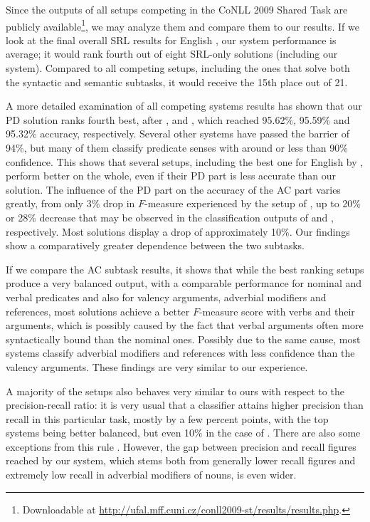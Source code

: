 \documentclass[12pt,notitlepage]{report}
\begin{document}
Since the outputs of all setups competing in the CoNLL 2009 Shared Task are publicly available\footnote{Downloadable at \url{http://ufal.mff.cuni.cz/conll2009-st/results/results.php}.}, we may analyze them and compare them to our results. If we look at the final overall SRL results for English \citep[cf. tables in][]{hajic09}, our system performance is average; it would rank fourth out of eight SRL-only solutions (including our system). Compared to all competing setups, including the ones that solve both the syntactic and semantic subtasks, it would receive the 15th place out of 21.

A more detailed examination of all competing systems results has shown that our PD solution ranks fourth best, after \citet{tackstrom09}, \citet{nugues09} and \citet{brown09}, which reached 95.62\%, 95.59\% and 95.32\% accuracy, respectively. Several other systems have passed the barrier of 94\%, but many of them classify predicate senses with around or less than 90\% confidence. This shows that several setups, including the best one for English by \citet{chen09}, perform better on the whole, even if their PD part is less accurate than our solution. The influence of the PD part on the accuracy of the AC part varies greatly, from only 3\% drop in $F$-measure experienced by the setup of \citet{li09}, up to 20\% or 28\% decrease that may be observed in the classification outputs of \citet{nugues09} and \citet{lin09}, respectively. Most solutions display a drop of approximately 10\%. Our findings show a comparatively greater dependence between the two subtasks.

If we compare the AC subtask results, it shows that while the best ranking setups \citep{nugues09,zhao09} produce a very balanced output, with a comparable performance for nominal and verbal predicates and also for valency arguments, adverbial modifiers and references, most solutions achieve a better $F$-measure score with verbs and their arguments, which is possibly caused by the fact that verbal arguments often more syntactically bound than the nominal ones. Possibly due to the same cause, most systems classify adverbial modifiers and references with less confidence than the valency arguments. These findings are very similar to our experience.

A majority of the setups also behaves very similar to ours with respect to the precision-recall ratio: it is very usual that a classifier attains higher precision than recall in this particular task, mostly by a few percent points, with the top systems being better balanced, but even 10\% in the case of \citet{meza-ruiz09}. There are also some exceptions from this rule \citep{vallejo09}. However, the gap between precision and recall figures reached by our system, which stems both from generally lower recall figures and extremely low recall in adverbial modifiers of nouns, is even wider.
\end{document}
